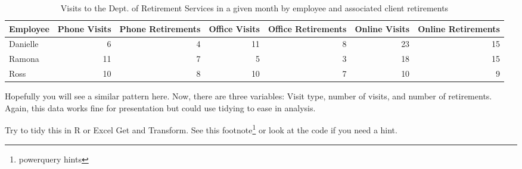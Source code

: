 \documentclass[]{book}
\newenvironment{Shaded}{\begin{snugshade}}{\end{snugshade}}
\newcommand{\DataTypeTok}[1]{\textcolor[rgb]{0.13,0.29,0.53}{#1}}
\newcommand{\KeywordTok}[1]{\textcolor[rgb]{0.13,0.29,0.53}{\textbf{#1}}}
\newcommand{\NormalTok}[1]{#1}
\newcommand{\OperatorTok}[1]{\textcolor[rgb]{0.81,0.36,0.00}{\textbf{#1}}}
\newcommand{\OtherTok}[1]{\textcolor[rgb]{0.56,0.35,0.01}{#1}}
\newcommand{\StringTok}[1]{\textcolor[rgb]{0.31,0.60,0.02}{#1}}
\begin{document}
\begin{table}

\caption{\label{tab:unnamed-chunk-2}Visits to the Dept. of Retirement Services in a given month by employee and associated client retirements}
\centering
\begin{tabular}[t]{l|r|r|r|r|r|r}
\hline
Employee & Phone Visits & Phone Retirements & Office Visits & Office Retirements & Online Visits & Online Retirements\\
\hline
Danielle & 6 & 4 & 11 & 8 & 23 & 15\\
\hline
Ramona & 11 & 7 & 5 & 3 & 18 & 15\\
\hline
Ross & 10 & 8 & 10 & 7 & 10 & 9\\
\hline
\end{tabular}
\end{table}

Hopefully you will see a similar pattern here. Now, there are three variables: Visit type, number of visits, and number of retirements. Again, this data works fine for presentation but could use tidying to ease in analysis.

\begin{Shaded}
\end{Shaded}

\hypertarget{htmlwidget-0780f32175b100d12cef}{}

Try to tidy this in R or Excel Get and Transform. See this footnote\footnote{powerquery hints} or look at the code if you need a hint.

\begin{Shaded}
\end{Shaded}
\end{document}
